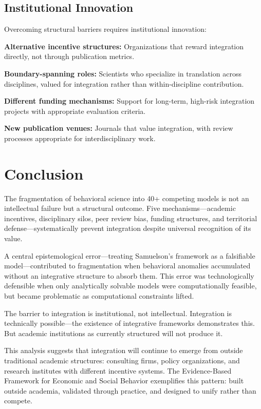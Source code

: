 \documentclass[12pt,a4paper]{article}
\begin{document}
\subsection{Institutional Innovation}

Overcoming structural barriers requires institutional innovation:

\textbf{Alternative incentive structures:} Organizations that reward integration directly, not through publication metrics.

\textbf{Boundary-spanning roles:} Scientists who specialize in translation across disciplines, valued for integration rather than within-discipline contribution.

\textbf{Different funding mechanisms:} Support for long-term, high-risk integration projects with appropriate evaluation criteria.

\textbf{New publication venues:} Journals that value integration, with review processes appropriate for interdisciplinary work.

\section{Conclusion}
\label{sec:conclusion}

The fragmentation of behavioral science into 40+ competing models is not an intellectual failure but a structural outcome. Five mechanisms---academic incentives, disciplinary silos, peer review bias, funding structures, and territorial defense---systematically prevent integration despite universal recognition of its value.

A central epistemological error---treating Samuelson's framework as a falsifiable model---contributed to fragmentation when behavioral anomalies accumulated without an integrative structure to absorb them. This error was technologically defensible when only analytically solvable models were computationally feasible, but became problematic as computational constraints lifted.

The barrier to integration is institutional, not intellectual. Integration is technically possible---the existence of integrative frameworks demonstrates this. But academic institutions as currently structured will not produce it.

This analysis suggests that integration will continue to emerge from outside traditional academic structures: consulting firms, policy organizations, and research institutes with different incentive systems. The Evidence-Based Framework for Economic and Social Behavior exemplifies this pattern: built outside academia, validated through practice, and designed to unify rather than compete.
\end{document}
